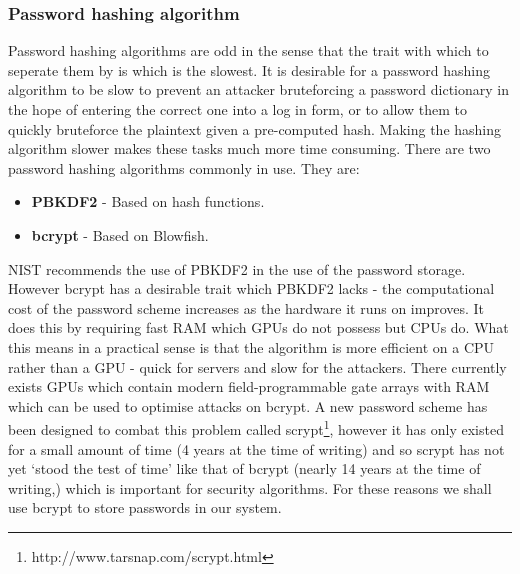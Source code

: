\documentclass[12pt, titlepage]{article}
\begin{document}
\subsubsection{Password hashing algorithm}
Password hashing algorithms are odd in the sense that the trait with which to seperate them by is which is the slowest. It is desirable for a password hashing algorithm to be slow to prevent an attacker bruteforcing a password dictionary in the hope of entering the correct one into a log in form, or to allow them to quickly bruteforce the plaintext given a pre-computed hash. Making the hashing algorithm slower makes these tasks much more time consuming.
\newline There are two password hashing algorithms commonly in use. They are:
\begin{itemize}
	\item \textbf{PBKDF2} - Based on hash functions.
	\item \textbf{bcrypt} - Based on Blowfish.
\end{itemize}
NIST recommends the use of PBKDF2 in the use of the password storage.\cite{nistPassword} However bcrypt has a desirable trait which PBKDF2 lacks - the computational cost of the password scheme increases as the hardware it runs on improves. It does this by requiring fast RAM which GPUs do not possess but CPUs do.\cite{bcryptPaper} What this means in a practical sense is that the algorithm is more efficient on a CPU rather than a GPU - quick for servers and slow for the attackers.
\newline \indent There currently exists GPUs which contain modern field-programmable gate arrays with RAM which can be used to optimise attacks on bcrypt. A new password scheme has been designed to combat this problem called scrypt\footnote{http://www.tarsnap.com/scrypt.html}, however it has only existed for a small amount of time (4 years at the time of writing) and so scrypt has not yet `stood the test of time' like that of bcrypt (nearly 14 years at the time of writing,) which is important for security algorithms.
\newline \indent For these reasons we shall use bcrypt to store passwords in our system.
\newline 
\end{document}
